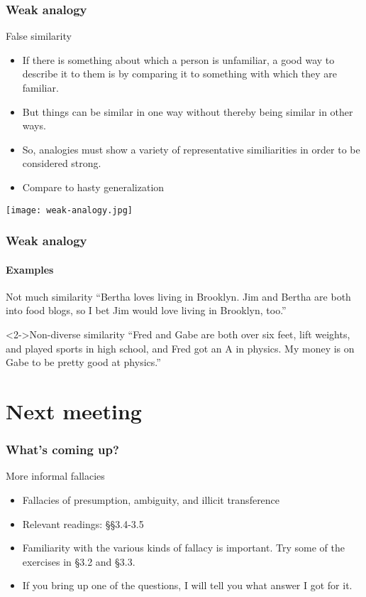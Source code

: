 \documentclass[10pt,letterpaper,xcolor=dvipsnames,handout]{beamer}
\begin{document}
\begin{frame}
  \frametitle{Weak analogy}
  
  \begin{block}{False similarity}
    \begin{itemize}
      \item If there is something about which a person is unfamiliar, a good way to describe it to them is by comparing it to something with which they are familiar.
      \item But things can be similar in one way without thereby being similar in other ways.
      \item So, analogies must show a variety of representative similiarities in order to be considered strong.
      \item Compare to hasty generalization
    \end{itemize}
  \end{block}
  
    \begin{center}
    \texttt{[image: weak-analogy.jpg]}
  \end{center}
  
\end{frame}

\begin{frame}
  \frametitle{Weak analogy}
  \framesubtitle{Examples}
  
  \begin{block}{Not much similarity}
    ``Bertha loves living in Brooklyn.  Jim and Bertha are both into food blogs, so I bet Jim would love living in Brooklyn, too.''
  \end{block}
  
  \begin{block}<2->{Non-diverse similarity}
    ``Fred and Gabe are both over six feet, lift weights, and played sports in high school, and Fred got an A in physics.  My money is on Gabe to be pretty good at physics.''
  \end{block}
  
\end{frame}

\section{Next meeting}

\begin{frame}
  \frametitle{What's coming up?}

  \begin{block}{More informal fallacies}
    \begin{itemize}
      \item Fallacies of presumption, ambiguity, and illicit transference
      \item Relevant readings: \S\S 3.4-3.5
      \item Familiarity with the various kinds of fallacy is important.  Try some of the exercises in \S3.2 and \S3.3.
      \item If you bring up one of the questions, I will tell you what answer I got for it.
    \end{itemize}
  \end{block}
  
\end{frame}
\end{document}
